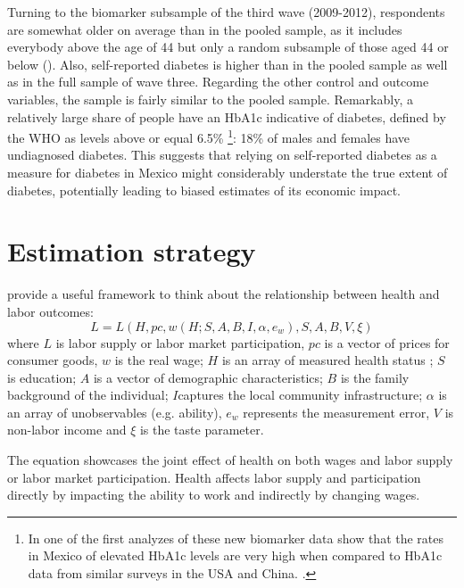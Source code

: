 \documentclass[12pt,english]{article}
\begin{document}
Turning to the biomarker subsample of the third wave (2009-2012), respondents are somewhat older on average than in the pooled sample, as it includes everybody above the age of 44 but only a random subsample of those aged 44 or below (\cite{Crimmins2015}). Also, self-reported diabetes is higher than in the pooled sample as well as in the full sample of wave three. Regarding the other control and outcome variables, the sample is fairly similar to the pooled sample. Remarkably, a relatively large share of people have an \ac{HbA1c} indicative of diabetes, defined by the \ac{WHO} as levels above or equal 6.5\% \parencite{WorldHealthOrganization2011}\footnote{In one of the first analyzes of these new biomarker data \textcite{Frankenberg2015} show that the rates in Mexico of elevated \ac{HbA1c} levels are very high when compared to \ac{HbA1c} data from similar surveys in the \ac{USA} and China. \parencite{Frankenberg2015}.}: 18\% of males and females have undiagnosed diabetes. This suggests that relying on self-reported diabetes as a measure for diabetes in Mexico might considerably understate the true extent of diabetes, potentially leading to biased estimates of its economic impact.

\section{\label{sec:Estimation Strategy}Estimation strategy}
 
\textcite{Strauss1998} provide a useful framework to think about the relationship between health and labor outcomes:
\begin{equation}
L=L(H, pc, w(H;S,A,B,I,\alpha,e_{w}), S, A, B, V, \xi) \label{eq:wage}
\end{equation}
where $L$ is labor supply or labor market participation, $pc $ is a vector of prices for consumer goods, $w$ is the real wage; $H$ is an array of measured health status ; $S$ is education; $A$ is a vector of demographic characteristics; $B$ is the family background of the individual; $I$captures the local community infrastructure; $\alpha$ is an array of unobservables (e.g. ability), $e_w$ represents the measurement error, $V$ is non-labor income and $\xi$ is the taste parameter. 

The equation showcases the joint effect of health on both wages and labor supply or labor market participation. Health affects labor supply and participation directly by impacting the ability to work and indirectly by changing wages.
\end{document}
